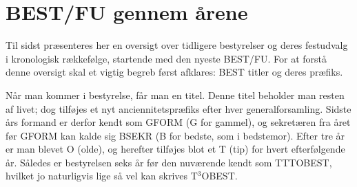 \chapter{BEST/FU gennem årene}
Til sidst præsenteres her en oversigt over tidligere bestyrelser og deres festudvalg i kronologisk rækkefølge, startende med den nyeste BEST/FU. For at forstå denne oversigt skal et vigtig begreb først afklares: BEST titler og deres præfiks.

Når man kommer i \TKETs bestyrelse, får man en titel. Denne titel beholder man resten af livet; dog tilføjes et nyt anciennitetspræfiks efter hver \TK generalforsamling. Sidste års formand er derfor kendt som GFORM (G for gammel), og sekretæren fra året før GFORM kan kalde sig BSEKR (B for bedste, som i bedstemor). Efter tre år er man blevet O (olde), og herefter tilføjes blot et T (tip) for hvert efterfølgende år. Således er bestyrelsen seks år før den nuværende kendt som TTTOBEST, hvilket jo naturligvis lige så vel kan skrives T$^3$OBEST.

\vfill
{}
\vfill

\newpage

\mbox{}\vfill

